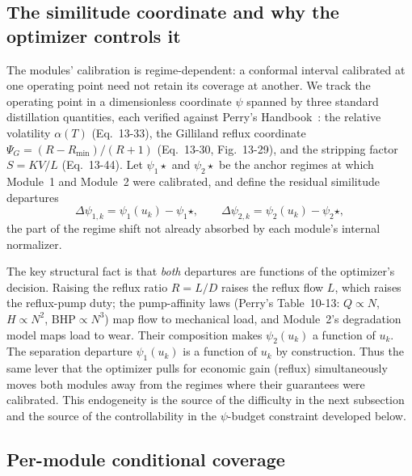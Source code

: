 \documentclass[review,12pt]{elsarticle}
\theoremstyle{definition}
\begin{document}
\subsection{The similitude coordinate and why the optimizer controls it}
\label{sec:psi}

The modules' calibration is regime-dependent: a conformal interval calibrated at
one operating point need not retain its coverage at another. We track the
operating point in a dimensionless coordinate $\psi$ spanned by three standard
distillation quantities, each verified against Perry's Handbook~\citep{perrys}:
the relative volatility $\alpha(T)$ (Eq.~13-33), the Gilliland reflux coordinate
$\Psi_G = (R - R_{\min})/(R+1)$ (Eq.~13-30, Fig.~13-29), and the stripping factor
$S = KV/L$ (Eq.~13-44). Let $\psi_1\!\star$ and $\psi_2\!\star$ be the anchor
regimes at which Module~1 and Module~2 were calibrated, and define the residual
similitude departures
\begin{equation}
\Delta\psi_{1,k} = \psi_1(u_k) - \psi_1\!\star, \qquad
\Delta\psi_{2,k} = \psi_2(u_k) - \psi_2\!\star,
\label{eq:departure}
\end{equation}
the part of the regime shift not already absorbed by each module's internal
normalizer.

The key structural fact is that \emph{both} departures are functions of the
optimizer's decision. Raising the reflux ratio $R = L/D$ raises the reflux flow
$L$, which raises the reflux-pump duty; the pump-affinity laws (Perry's
Table~10-13: $Q \propto N$, $H \propto N^2$, $\mathrm{BHP} \propto N^3$) map flow
to mechanical load, and Module~2's degradation model maps load to wear. Their
composition makes $\psi_2(u_k)$ a function of $u_k$. The separation departure
$\psi_1(u_k)$ is a function of $u_k$ by construction. Thus the same lever that
the optimizer pulls for economic gain (reflux) simultaneously moves both
modules away from the regimes where their guarantees were calibrated. This endogeneity is the source of the difficulty in the next subsection and the
source of the controllability in the $\psi$-budget constraint developed below.

\subsection{Per-module conditional coverage}
\label{sec:permodule}
\end{document}
